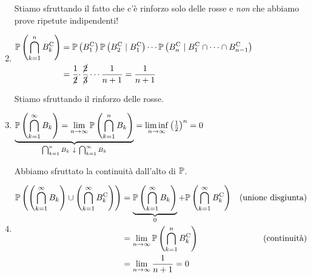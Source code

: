 \begin{enumerate}
Stiamo sfruttando il fatto che c'è rinforzo solo delle rosse e \textit{non} che abbiamo prove ripetute indipendenti!
\item $\begin{aligned}
\mathbb{P}\left(\bigcap\limits _{k=1}^{n} B_{k}^{\mathrm{C}}\right) & =\mathbb{P}\left( B_{1}^{\mathrm{C}}\right)\mathbb{P}\left( B_{2}^{\mathrm{C}} \mid B_{1}^{\mathrm{C}}\right) \cdots \mathbb{P}\left( B_{n}^{\mathrm{C}} \mid B_{1}^{\mathrm{C}} \cap \cdots \cap B_{n-1}^{\mathrm{C}}\right)\\
 & =\frac{1}{\cancel{2}} \cdotp \frac{\cancel{2}}{\cancel{3}} \cdots \frac{1}{n+1} =\frac{1}{n+1}
\end{aligned}$

Stiamo sfruttando il rinforzo delle rosse.
\item $\underbrace{\mathbb{P}\left(\bigcap\limits _{k=1}^{\infty } B_{k}\right) =\lim\limits _{n\rightarrow \infty }\mathbb{P}\left(\bigcap\limits _{k=1}^{n} B_{k}\right)}_{\bigcap _{k=1}^{n} B_{k} \ \downarrow \ \bigcap _{k=1}^{\infty } B_{k}} =\liminf\limits _{n\rightarrow \infty }\left(\frac{1}{2}\right)^{n} =0$

Abbiamo sfruttato la continuità dall'alto di $\mathbb{P}$.
\item $\begin{aligned}
\mathbb{P}\left(\left(\bigcap\limits _{k=1}^{\infty } B_{k}\right) \cup \left(\bigcap\limits _{k=1}^{\infty } B_{k}^{\mathrm{C}}\right)\right) & =\underbrace{\mathbb{P}\left(\bigcap\limits _{k=1}^{\infty } B_{k}\right)}_{0} +\mathbb{P}\left(\bigcap\limits _{k=1}^{\infty } B_{k}^{\mathrm{C}}\right) & \text{(unione disgiunta)}\\
 & =\lim\limits _{n\rightarrow \infty }\mathbb{P}\left(\bigcap\limits _{k=1}^{n} B_{k}^{\mathrm{C}}\right) & \text{(continuità)}\\
 & =\lim\limits _{n\rightarrow \infty }\frac{1}{n+1} =0 & 
\end{aligned}$
\end{enumerate}
\Soluzione